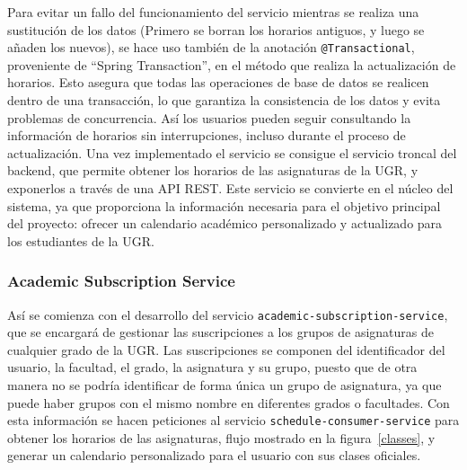 Para evitar un fallo del funcionamiento del servicio mientras se realiza una sustitución de los datos (Primero se borran los horarios antiguos, y luego se añaden los nuevos), se hace uso también de la anotación \texttt{@Transactional}, proveniente de ``Spring Transaction'', en el método que realiza la actualización de horarios. Esto asegura que todas las operaciones de base de datos se realicen dentro de una transacción, lo que garantiza la consistencia de los datos y evita problemas de concurrencia. Así los usuarios pueden seguir consultando la información de horarios sin  interrupciones, incluso durante el proceso de actualización.
\newline\newline
Una vez implementado el servicio se consigue el servicio troncal del backend, que permite obtener los horarios de las asignaturas de la UGR, y exponerlos a través de una API REST. Este servicio se convierte en el núcleo del sistema, ya que proporciona la información necesaria para el objetivo principal del proyecto: ofrecer un calendario académico personalizado y actualizado para los estudiantes de la UGR.

\subsubsection{Academic Subscription Service}
Así se comienza con el desarrollo del servicio \texttt{academic-subscription-service}, que se encargará de gestionar las suscripciones a los grupos de asignaturas de cualquier grado de la UGR.\newline
Las suscripciones se componen del identificador del usuario, la facultad, el grado, la asignatura y su grupo, puesto que de otra manera no se podría identificar de forma única un grupo de asignatura, ya que puede haber grupos con el mismo nombre en diferentes grados o facultades. Con esta información se hacen peticiones al servicio \texttt{schedule-consumer-service} para obtener los horarios de las asignaturas, flujo mostrado en la figura~\ref{classes}, y generar un calendario personalizado para el usuario con sus clases oficiales.\newline

